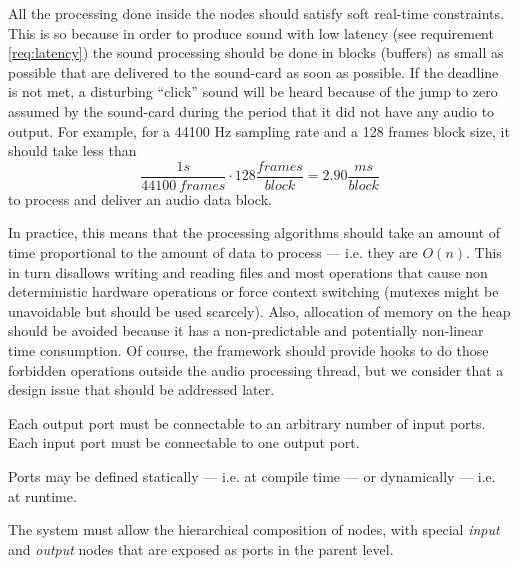 \begin{mynote} \label{note:realtime} All the
  processing done inside the nodes should satisfy soft real-time
  constraints. This is so because in order to produce sound with low
  latency (see requirement \ref{req:latency}) the sound processing
  should be done in blocks (buffers) as small as possible that are
  delivered to the sound-card as soon as possible. If the deadline is
  not met, a disturbing ``click'' sound will be heard because of the
  jump to zero assumed by the sound-card during the period that it did
  not have any audio to output. For example, for a 44100 Hz sampling
  rate and a 128 frames block size, it should take less than $$\frac{1
    s}{44100\ frames}\cdot128\frac{frames}{block}=2.90
  \frac{ms}{block}$$ to process and deliver an audio data
  block.

  In practice, this means that the processing algorithms should take
  an amount of time proportional to the amount of data to process ---
  i.e. they are $O(n)$. This in turn disallows writing and reading
  files and most operations that cause non deterministic hardware
  operations or force context switching (mutexes might be unavoidable
  but should be used scarcely). Also, allocation of memory on the heap
  should be avoided because it has a non-predictable and potentially
  non-linear time consumption. Of course, the framework should provide
  hooks to do those forbidden operations outside the audio processing
  thread, but we consider that a design issue that should be addressed
  later.
\end{mynote}

\begin{requirement}\label{req:port-one-to-many}
  Each output port must be connectable to an arbitrary number of input
  ports. Each input port must be connectable to one output port.
\end{requirement}

\begin{requirement}
Ports may be defined statically --- i.e. at compile time --- or
dynamically --- i.e. at runtime.
\end{requirement}

\begin{requirement}
The system must allow the hierarchical composition of nodes, with
special \emph{input} and \emph{output} nodes that are exposed as ports
in the parent level.
\end{requirement}

